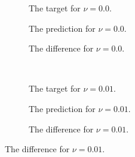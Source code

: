 \documentclass[preprint,12pt,times,authoryear]{elsarticle}
\begin{document}
\begin{figure}[hbp]
  \centering
  \begin{adjustwidth}{-0.1\linewidth}{-0.1\linewidth}
    \begin{subfigure}{0.33\linewidth}
      \begin{adjustbox}{width=\linewidth}
        
      \end{adjustbox}
      \caption{The target for \(\nu=0.0\).}\label{fig:sc2_exact_target_0.0}
    \end{subfigure}
    \begin{subfigure}{0.33\linewidth}
      \begin{adjustbox}{width=\linewidth}
        
      \end{adjustbox}
      \caption{The prediction for \(\nu=0.0\).}\label{fig:sc2_exact_pred_0.0}
    \end{subfigure}
    \begin{subfigure}{0.32\linewidth}
      \begin{adjustbox}{width=\linewidth}
        
      \end{adjustbox}
      \caption{The difference for \(\nu=0.0\).}\label{fig:sc2_exact_diff_0.0}
    \end{subfigure}
    \\[0.7\baselineskip]
    \begin{subfigure}{0.33\linewidth}
      \begin{adjustbox}{width=\linewidth}
        
      \end{adjustbox}
      \caption{The target for \(\nu=0.01\).}\label{fig:sc2_exact_target_0.01}
    \end{subfigure}
    \begin{subfigure}{0.33\linewidth}
      \begin{adjustbox}{width=\linewidth}
        
      \end{adjustbox}
      \caption{The prediction for \(\nu=0.01\).}\label{fig:sc2_exact_pred_0.01}
    \end{subfigure}
    \begin{subfigure}{0.32\linewidth}
      \begin{adjustbox}{width=\linewidth}
        
      \end{adjustbox}
      \caption{The difference for \(\nu=0.01\).}\label{fig:sc2_exact_diff_0.01}

\end{subfigure}
\end{adjustwidth}
\end{figure}
\end{document}
